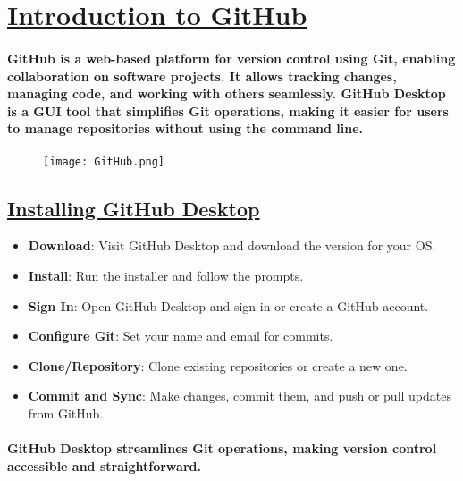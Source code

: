 \documentclass[12pt, a4paper]{article}
\begin{document}
\newpage

\usetikzlibrary{calc}


\section*{\underline{Introduction to GitHub}}
\paragraph{GitHub is a web-based platform for version control using Git, enabling collaboration on software projects. It allows tracking changes, managing code, and working with others seamlessly.
GitHub Desktop is a GUI tool that simplifies Git operations, making it easier for users to manage repositories without using the command line.}

\begin{figure}
    \centering
    \texttt{[image: GitHub.png]}
\end{figure}
\subsection*{\underline{Installing GitHub Desktop}}
\begin{itemize}
    \item \textbf{Download}: Visit GitHub Desktop and download the version for your OS.
    \item \textbf{Install}: Run the installer and follow the prompts.
    \item \textbf{Sign In}: Open GitHub Desktop and sign in or create a GitHub account.
    \item \textbf{Configure Git}: Set your name and email for commits.
    \item \textbf{Clone/Repository}: Clone existing repositories or create a new one.
    \item \textbf{Commit and Sync}: Make changes, commit them, and push or pull updates from GitHub.
\end{itemize}
\paragraph{GitHub Desktop streamlines Git operations, making version control accessible and straightforward.}
\end{document}
